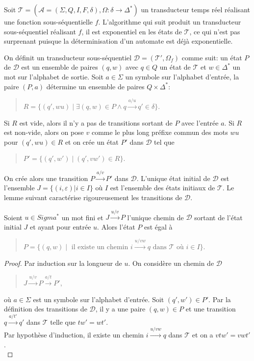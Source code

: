 	Soit $\mathscr{T} = (\mathscr{A} = (\Sigma, Q, I, F, \delta), \Omega : \delta \to \Delta^*)$ un transducteur temps réel réalisant une fonction sous-séquentielle $f$. L'algorithme qui suit produit un transducteur sous-séquentiel réalisant $f$, il est exponentiel en les états de $\mathscr{T}$, ce qui n'est pas surprenant puisque la déterminisation d'un automate est déjà exponentielle.
	
	On définit un transducteur sous-séquentiel $\mathscr{D} = (\mathscr{T'}, \Omega_f)$ comme suit: un état $P$ de $\mathscr{D}$ est un ensemble de paires $(q,w)$ avec $q \in Q$ un état de $\mathscr{T}$ et $w \in \Delta^*$ un mot sur l'alphabet de sortie. Soit $a \in \Sigma$ un symbole sur l'alphabet d'entrée, la paire $(P, a)$ détermine un ensemble de paires $Q \times \Delta^*$:
	\begin{quotation}
		$R = \{(q',wu) \mid \exists (q,w) \in P \wedge q \xrightarrow{a/u} q' \in \delta \}$.
	\end{quotation}
	Si $R$ est vide, alors il n'y a pas de transitions sortant de $P$ avec l'entrée $a$. Si $R$ est non-vide, alors on pose $v$ comme le plus long préfixe commun des mots $wu$ pour $(q',wu) \in R$ et on crée un état $P'$ dans $\mathscr{D}$ tel que
	\begin{quotation}
		$P' = \{(q',w') \mid (q',vw') \in R \}$.
	\end{quotation}
	On crée alors une transition $P \xrightarrow{a/v} P'$ dans $\mathscr{D}$. L'unique état initial de $\mathscr{D}$ est l'ensemble $J = \{(i,\varepsilon) | i \in I\}$ où $I$ est l'ensemble des états initiaux de $\mathscr{T}$. Le lemme suivant caractérise rigoureusement les transitions de $\mathscr{D}$. \\
	
	\begin{lemma}
		\label{lem4}
		Soient $u \in Sigma^*$ un mot fini et $J \xrightarrow{u/v} P$ l'unique chemin de $\mathscr{D}$ sortant de l'état initial $J$ et ayant pour entrée $u$. Alors l'état $P$ est égal à
		\begin{quotation}
			$P = \{(q,w) \mid \text{ il existe un chemin } i \xrightarrow{u/vw} q \text{ dans } \mathscr{T} \text{ où } i \in I \}$.
		\end{quotation}
	\end{lemma}
	\begin{proof}
		Par induction sur la longueur de $u$. On considère un chemin de $\mathscr{D}$
		\begin{quotation}
			$J \xrightarrow{u/v} P \xrightarrow{a/t} P'$,
		\end{quotation}
		où $a \in \Sigma$ est un symbole sur l'alphabet d'entrée. Soit $(q',w') \in P'$. Par la définition des transitions de $\mathscr{D}$, il y a une paire $(q,w) \in P$ et une transition $q \xrightarrow{a/t'} q'$ dans $\mathscr{T}$ telle que $tw' = wt'$. \\
		Par hypothèse d'induction, il existe un chemin $i \xrightarrow{u/vw} q$ dans $\mathscr{T}$ et on a $vtw' = vwt'$. \\
	\end{proof}
	
